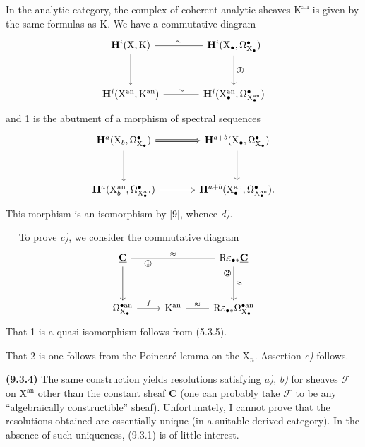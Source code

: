 \documentclass[11pt,leqno]{article}
\newcommand{\Page}[1]{\ifvmode\noindent\else\unskip\ \fi{\footnotesize\textcolor{gray}{[p.\,#1]}}\ \ignorespaces}
\begin{document}
In the analytic category, the complex of coherent analytic sheaves \(\mathrm{K}^{\mathrm{an}}\) is given by the same formulas as \(\mathrm{K}\). We have a commutative diagram
\[
\begin{tikzcd}[ampersand replacement=\&, column sep=large, row sep=3em]
\mathbf{H}^{i}(\mathrm{X},\mathrm{K})
  \arrow[r, dash, "\sim"]\arrow[d]
\&
\mathbf{H}^{i}(\mathrm{X}_{\bullet},\Omega_{\mathrm{X}_{\bullet}}^{\bullet})
  \arrow[d, "\text{\textcircled{1}}"]
\\
\mathbf{H}^{i}(\mathrm{X}^{\mathrm{an}},\mathrm{K}^{\mathrm{an}})
  \arrow[r, dash, "\sim"]
\&
\mathbf{H}^{i}(\mathrm{X}_{\bullet}^{\mathrm{an}},
              \Omega_{\mathrm{X}_{\bullet}^{\mathrm{an}}}^{\bullet})
\end{tikzcd}
\]
and 1 is the abutment of a morphism of spectral sequences
\[
\begin{tikzcd}[ampersand replacement=\&, column sep=large, row sep=3em]
\mathbf{H}^{a}(\mathrm{X}_{b},\Omega_{\mathrm{X}_{\bullet}}^{\bullet})
  \arrow[r, Rightarrow]\arrow[d]
\&
\mathbf{H}^{a+b}(\mathrm{X}_{\bullet},\Omega_{\mathrm{X}_{\bullet}}^{\bullet})
  \arrow[d]
\\
\mathbf{H}^{a}(\mathrm{X}_{b}^{\mathrm{an}},
              \Omega_{\mathrm{X}_{\bullet}^{\mathrm{an}}}^{\bullet})
  \arrow[r, Rightarrow]
\&
\mathbf{H}^{a+b}(\mathrm{X}_{\bullet}^{\mathrm{an}},
                \Omega_{\mathrm{X}_{\bullet}^{\mathrm{an}}}^{\bullet}).
\end{tikzcd}
\]
This morphism is an isomorphism by [9], whence \textit{d)}.

\Page{53}
To prove \textit{c)}, we consider the commutative diagram
\[
\begin{tikzcd}[column sep=2.4em, row sep=3.5em]
\underline{\mathbf{C}}
  \arrow[rr, dash, "\approx", "{\text{\textcircled{1}}}"'{pos=.2}]
  \arrow[d]
& &
\mathrm{R}\varepsilon_{\bullet *}\underline{\mathbf{C}}
  \arrow[d, "\approx", "{\text{\textcircled{2}}}"'{pos=.2}]
\\
\Omega_{\mathrm{X}_{\bullet}}^{\bullet\mathrm{an}}
  \arrow[r, "f"]
&
\mathrm{K}^{\mathrm{an}}
  \arrow[r, dash, "\approx"]
&
\mathrm{R}\varepsilon_{\bullet *}
  \Omega_{\mathrm{X}_{\bullet}}^{\bullet\mathrm{an}}
\end{tikzcd}
\]
That 1 is a quasi-isomorphism follows from (5.3.5).\par
That 2 is one follows from the Poincaré lemma on the \(\mathrm{X}_n\).
Assertion \textit{c)} follows.

\textbf{(9.3.4)} The same construction yields resolutions satisfying
\textit{a)}, \textit{b)} for sheaves \(\mathscr{F}\) on
\(\mathrm{X}^{\mathrm{an}}\) other than the constant sheaf \(\mathbf{C}\)
(one can probably take \(\mathscr{F}\) to be any
“algebraically constructible” sheaf). Unfortunately, I cannot
prove that the resolutions obtained are essentially unique
(in a suitable derived category). In the absence of such
uniqueness, (9.3.1) is of little interest.
\end{document}
